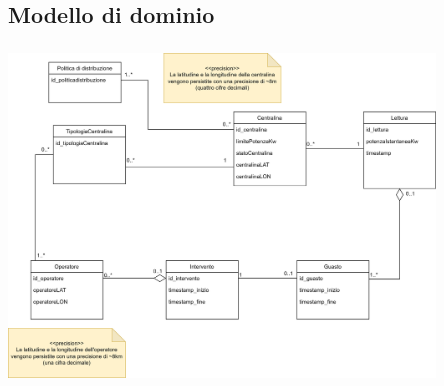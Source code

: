 \documentclass{beamer}
\begin{document}
	\subsection{Modello di dominio}\label{domain_model}
	\begin{frame}
		\frametitle{}
		\begin{center}
			\includegraphics[width=0.85\textwidth, height=\textheight, keepaspectratio=true]{domain_model.png}
		\end{center}
	\end{frame}
	
\end{document}
